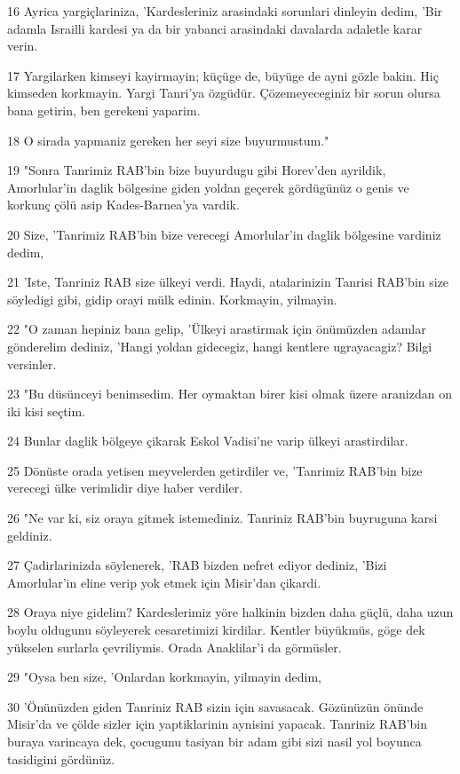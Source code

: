 \par 16 Ayrica yargiçlariniza, 'Kardesleriniz arasindaki sorunlari dinleyin dedim, 'Bir adamla Israilli kardesi ya da bir yabanci arasindaki davalarda adaletle karar verin.
\par 17 Yargilarken kimseyi kayirmayin; küçüge de, büyüge de ayni gözle bakin. Hiç kimseden korkmayin. Yargi Tanri'ya özgüdür. Çözemeyeceginiz bir sorun olursa bana getirin, ben gerekeni yaparim.
\par 18 O sirada yapmaniz gereken her seyi size buyurmustum."
\par 19 "Sonra Tanrimiz RAB'bin bize buyurdugu gibi Horev'den ayrildik, Amorlular'in daglik bölgesine giden yoldan geçerek gördügünüz o genis ve korkunç çölü asip Kades-Barnea'ya vardik.
\par 20 Size, 'Tanrimiz RAB'bin bize verecegi Amorlular'in daglik bölgesine vardiniz dedim,
\par 21 'Iste, Tanriniz RAB size ülkeyi verdi. Haydi, atalarinizin Tanrisi RAB'bin size söyledigi gibi, gidip orayi mülk edinin. Korkmayin, yilmayin.
\par 22 "O zaman hepiniz bana gelip, 'Ülkeyi arastirmak için önümüzden adamlar gönderelim dediniz, 'Hangi yoldan gidecegiz, hangi kentlere ugrayacagiz? Bilgi versinler.
\par 23 "Bu düsünceyi benimsedim. Her oymaktan birer kisi olmak üzere aranizdan on iki kisi seçtim.
\par 24 Bunlar daglik bölgeye çikarak Eskol Vadisi'ne varip ülkeyi arastirdilar.
\par 25 Dönüste orada yetisen meyvelerden getirdiler ve, 'Tanrimiz RAB'bin bize verecegi ülke verimlidir diye haber verdiler.
\par 26 "Ne var ki, siz oraya gitmek istemediniz. Tanriniz RAB'bin buyruguna karsi geldiniz.
\par 27 Çadirlarinizda söylenerek, 'RAB bizden nefret ediyor dediniz, 'Bizi Amorlular'in eline verip yok etmek için Misir'dan çikardi.
\par 28 Oraya niye gidelim? Kardeslerimiz yöre halkinin bizden daha güçlü, daha uzun boylu oldugunu söyleyerek cesaretimizi kirdilar. Kentler büyükmüs, göge dek yükselen surlarla çevriliymis. Orada Anaklilar'i da görmüsler.
\par 29 "Oysa ben size, 'Onlardan korkmayin, yilmayin dedim,
\par 30 'Önünüzden giden Tanriniz RAB sizin için savasacak. Gözünüzün önünde Misir'da ve çölde sizler için yaptiklarinin aynisini yapacak. Tanriniz RAB'bin buraya varincaya dek, çocugunu tasiyan bir adam gibi sizi nasil yol boyunca tasidigini gördünüz.
